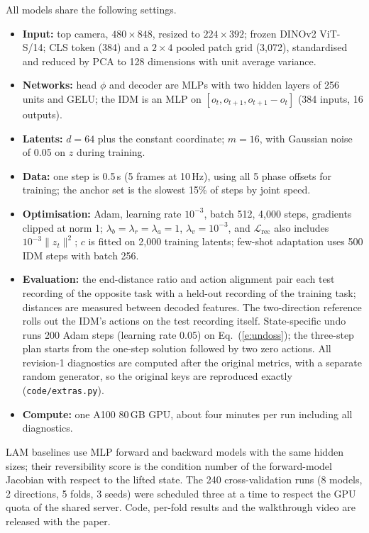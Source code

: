 \documentclass{jcse}
\begin{document}
All models share the following settings.
\begin{itemize}
	\item \textbf{Input:} top camera, $480\times848$, resized to $224\times392$; frozen DINOv2 ViT-S/14; CLS token (384) and a $2\times4$ pooled patch grid (3,072), standardised and reduced by PCA to 128 dimensions with unit average variance.
	\item \textbf{Networks:} head $\phi$ and decoder are MLPs with two hidden layers of 256 units and GELU; the IDM is an MLP on $[o_t,o_{t+1},o_{t+1}-o_t]$ (384 inputs, 16 outputs).
	\item \textbf{Latents:} $d=64$ plus the constant coordinate; $m=16$, with Gaussian noise of 0.05 on $z$ during training.
	\item \textbf{Data:} one step is 0.5\,s (5 frames at 10\,Hz), using all 5 phase offsets for training; the anchor set is the slowest 15\% of steps by joint speed.
	\item \textbf{Optimisation:} Adam, learning rate $10^{-3}$, batch 512, 4,000 steps, gradients clipped at norm 1; $\lambda_b=\lambda_r=\lambda_a=1$, $\lambda_v=10^{-3}$, and $\mathcal{L}_{\mathrm{rec}}$ also includes $10^{-3}\|z_t\|^2$; $c$ is fitted on 2,000 training latents; few-shot adaptation uses 500 IDM steps with batch 256.
	\item \textbf{Evaluation:} the end-distance ratio and action alignment pair each test recording of the opposite task with a held-out recording of the training task; distances are measured between decoded features. The two-direction reference rolls out the IDM's actions on the test recording itself. State-specific undo runs 200 Adam steps (learning rate 0.05) on Eq.~(\ref{e:undoss}); the three-step plan starts from the one-step solution followed by two zero actions. All revision-1 diagnostics are computed after the original metrics, with a separate random generator, so the original keys are reproduced exactly (\texttt{code/extras.py}).
	\item \textbf{Compute:} one A100 80\,GB GPU, about four minutes per run including all diagnostics.
\end{itemize}
LAM baselines use MLP forward and backward models with the same hidden sizes; their reversibility score is the condition number of the forward-model Jacobian with respect to the lifted state.
The 240 cross-validation runs (8 models, 2 directions, 5 folds, 3 seeds) were scheduled three at a time to respect the GPU quota of the shared server.
Code, per-fold results and the walkthrough video are released with the paper.
\end{document}
